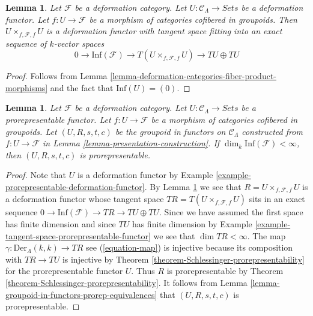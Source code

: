 \documentclass{stacks-project}
\theoremstyle{plain}
\newtheorem{lemma}[subsection]{Lemma}
\theoremstyle{definition}
\theoremstyle{remark}
\numberwithin{equation}{subsection}
\begin{document}
\begin{lemma}
\label{lemma-deformation-functor-diagonal}
Let $\mathcal{F}$ be a deformation category.
Let $U : \mathcal{C}_\Lambda \to \textit{Sets}$ be a deformation functor.
Let $f: U \to \mathcal{F}$ be a morphism of categories cofibered in groupoids.
Then $U \times_{f, \mathcal{F}, f} U$ is a deformation functor
with tangent space fitting into an exact sequence of $k$-vector spaces
$$
0 \to \text{Inf}(\mathcal{F}) \to
T(U \times_{f, \mathcal{F}, f} U) \to TU \oplus TU
$$
\end{lemma}

\begin{proof}
Follows from
Lemma \ref{lemma-deformation-categories-fiber-product-morphisms}
and the fact that $\text{Inf}(U) = (0)$.
\end{proof}

\begin{lemma}
\label{lemma-prorepresentable-groupoid-in-functors-construction}
Let $\mathcal{F}$ be a deformation category.
Let $U : \mathcal{C}_\Lambda \to \textit{Sets}$ be a prorepresentable functor.
Let $f : U \to \mathcal{F}$ be a morphism of categories cofibered in groupoids.
Let $(U, R, s, t, c)$ be the groupoid in functors on $\mathcal{C}_\Lambda$
constructed from $f : U \to \mathcal{F}$ in
Lemma \ref{lemma-presentation-construction}. If
$\dim_k \text{Inf}(\mathcal{F}) < \infty$, then
$(U, R, s, t, c)$ is prorepresentable.
\end{lemma}

\begin{proof}
Note that $U$ is a deformation functor by
Example \ref{example-prorepresentable-deformation-functor}.
By
Lemma \ref{lemma-deformation-functor-diagonal}
we see that $R = U \times_{f, \mathcal{F}, f} U$
is a deformation functor whose tangent space
$TR = T(U \times_{f, \mathcal{F}, f} U)$ sits in an exact sequence
$0 \to \text{Inf}(\mathcal{F}) \to TR \to TU \oplus TU$.
Since we have assumed the first space has finite dimension and since
$TU$ has finite dimension by
Example \ref{example-tangent-space-prorepresentable-functor}
we see that $\dim TR < \infty$. The map
$\gamma : \text{Der}_\Lambda(k, k) \to TR$ see (\ref{equation-map})
is injective because its composition with $TR \to TU$ is injective by
Theorem \ref{theorem-Schlessinger-prorepresentability}
for the prorepresentable functor $U$. Thus $R$ is prorepresentable by
Theorem \ref{theorem-Schlessinger-prorepresentability}.
It follows from
Lemma \ref{lemma-groupoid-in-functors-prorep-equivalences}
that $(U, R, s, t, c)$ is prorepresentable.
\end{proof}
\end{document}
